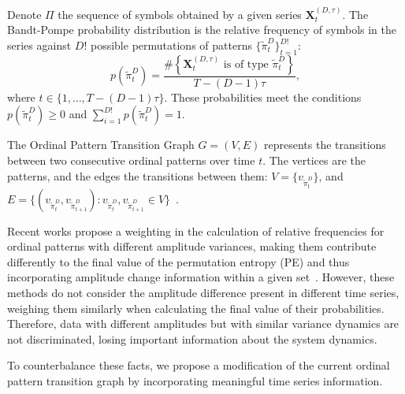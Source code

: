 \documentclass[journal]{IEEEtran}
\begin{document}
Denote $\Pi$ the sequence of symbols obtained by a given series $\mathbf{X}_t^{(D,\tau)}$.
The Bandt-Pompe probability distribution is the relative frequency of symbols in the series against $D!$ possible permutations of patterns $\{\widetilde\pi_t^D \}_{t = 1}^{D!}$:
%
\begin{equation}
   p(\widetilde\pi_t^D) = \frac{\#\left \{\mathbf{X}_t^{(D,\tau)} \text{ is of type } \widetilde\pi_t^D\right \}}{T- (D-1)\tau},  
\end{equation}
where  $t\in \{1, \dots, T-(D-1)\tau\}$.
These probabilities meet the conditions $p(\widetilde\pi_t^D) \ge 0$ and  $\sum_{i=1}^{D!} p(\widetilde\pi_t^D) = 1$.

The Ordinal Pattern Transition Graph ${G} = ({V}, {E})$ 
represents the transitions between two consecutive ordinal patterns over time $t$.
The vertices are the patterns, and the edges the transitions between them:
$V = \{v_{\widetilde\pi_t^D}\}$, and 
$E = \{(v_{\widetilde\pi_t^D}, v_{\widetilde\pi_{t+1}^D}): v_{\widetilde\pi_t^D}, v_{\widetilde\pi_{t+1}^D} \in V \}$~\cite{LearningandDistinguishingTimeSeriesDynamicsViaOrdinalPatternsTransitionGraphs2019}.

Recent works propose a weighting in the calculation of relative frequencies for ordinal patterns with different amplitude variances, making them contribute differently to the final value of the permutation entropy (PE) and thus incorporating amplitude change information within a given set~\cite{Fadlallah2013Weightedpermutation}.
However, these methods do not consider the amplitude difference present in different time series, weighing them similarly when calculating the final value of their probabilities.
Therefore, data with different amplitudes but with similar variance dynamics are not discriminated, losing important information about the system dynamics.

To counterbalance these facts, we propose a modification of the current ordinal pattern transition graph by incorporating meaningful time series information.
\end{document}
